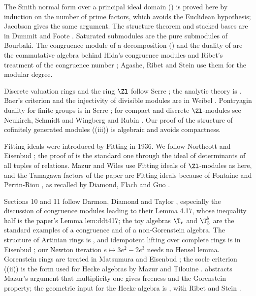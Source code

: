 The Smith normal form over a principal ideal domain () is proved here by induction on the number of prime factors, which avoids
the Euclidean hypothesis; Jacobson \cite[Section 3.7]{Jacobson85} gives the same argument. The structure theorem and stacked bases are in Dummit and Foote
\cite[Section 12.1]{DummitFoote}. Saturated submodules are the pure submodules of Bourbaki. The congruence module of a decomposition
() and the duality of  are the commutative algebra behind Hida's congruence modules
\cite{Hida81} and Ribet's treatment of the congruence number \cite{Ribet83}; Agashe, Ribet and Stein \cite{ARS12} use them for the modular degree.

Discrete valuation rings and the ring $\Zl$ follow Serre \cite[Chapters I and II]{SerreLocalFields}; the analytic theory is . Baer's criterion and
the injectivity of divisible modules are in Weibel \cite[Section 2.3]{Weibel}. Pontryagin duality for finite groups is in Serre \cite[Chapter VI, Section 1]{SerreCourse};
for compact and discrete $\Zl$-modules see Neukirch, Schmidt and Wingberg \cite[Chapter I, Section 1]{NSW} and Rubin \cite[Appendix B]{Rubin}. Our proof of the
structure of cofinitely generated modules ((iii)) is algebraic and avoids compactness.

Fitting ideals were introduced by Fitting in 1936. We follow Northcott \cite{Northcott76} and Eisenbud \cite[Section 20.2]{Eisenbud}; the proof of
 is the standard one through the ideal of determinants of all tuples of
relations. Mazur and Wiles \cite[Appendix]{MazurWiles84} use Fitting ideals of $\Zl$-modules as here, and the Tamagawa factors of the paper are Fitting ideals because
of Fontaine and Perrin-Riou \cite[I.4.2.2]{FPR94}, as recalled by Diamond, Flach and Guo \cite{DFG04}.

Sections 10 and 11 follow Darmon, Diamond and Taylor \cite[Section 4]{DDT}, especially the discussion of congruence modules leading to their Lemma 4.17, whose
inequality half is the paper's Lemma lem:ddt417; the toy algebras $\T_r$ and $\T^\flat_3$ are the standard examples of a congruence and of a non-Gorenstein algebra.
The structure of Artinian rings is \cite[Chapter 8]{AtiyahMacdonald}, and idempotent lifting over complete rings is in Eisenbud \cite[Section 7.5]{Eisenbud}; our Newton
iteration $e\mapsto3e^2-2e^3$ needs no Hensel lemma. Gorenstein rings are treated in Matsumura \cite[Chapter 18]{Matsumura86} and Eisenbud \cite[Chapter 21]{Eisenbud};
the socle criterion ((ii)) is the form used for Hecke algebras by Mazur \cite[Chapter II, Section 15]{Mazur77} and Tilouine \cite{Tilouine97}.
 abstracts Mazur's argument that multiplicity one gives freeness and the Gorenstein property; the geometric input for the Hecke
algebra is , with Ribet and Stein \cite{RibetStein}.

